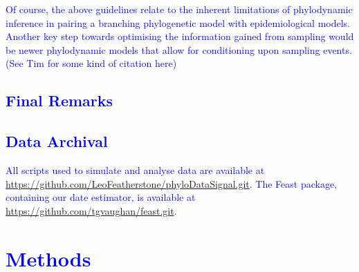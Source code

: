 \documentclass{article}
\begin{document}
\textcolor{blue}{Of course, the above guidelines relate to the inherent limitations of phylodynamic inference in pairing a branching phylogenetic model with epidemiological models. Another key step towards optimising the information gained from sampling would be newer phylodynamic models that allow for conditioning upon sampling events. (See Tim for some kind of citation here)}
    
\textcolor{blue}{\subsection{Final Remarks}

\subsection*{Data Archival}
All scripts used to simulate and analyse data are available at \url{https://github.com/LeoFeatherstone/phyloDataSignal.git}. The Feast package, containing our date estimator, is available at \url{https://github.com/tgvaughan/feast.git}.
\section*{Methods}
}
\end{document}
